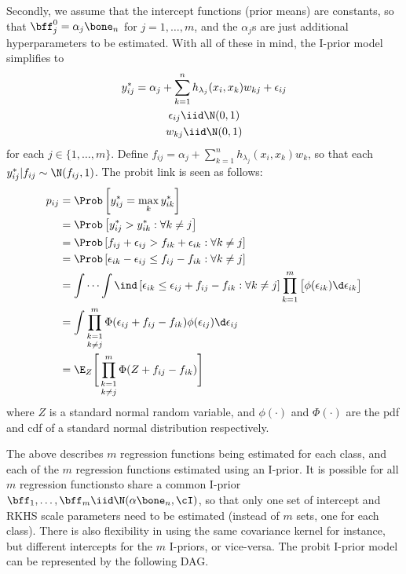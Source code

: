 Secondly, we assume that the intercept functions (prior means) are constants, so that $\bff^0_j = \alpha_j\bone_n$ for $j=1,\dots,m$, and the $\alpha_j$s are just additional hyperparameters to be estimated. With all of these in mind, the I-prior model simplifies to
\begin{gather*}
  y_{ij}^* = \alpha_j + \sum_{k=1}^n h_{\lambda_j}(x_i, x_{k})w_{kj} + \epsilon_{ij} \\
  \epsilon_{ij} \iid \N(0,1) \\
  w_{kj} \iid \N(0,1) 
\end{gather*}
for each $j \in \{1,\dots,m\}$. Define $f_{ij} = \alpha_j + \sum_{k=1}^n h_{\lambda_j}(x_i, x_{k})w_k$, so that each $y_{ij}^*|f_{ij} \sim \N(f_{ij}, 1)$. The probit link is seen as follows:
\begin{align}
  p_{ij} 
  &= \Prob\left[y_{ij}^* = \max_k y_{ik}^* \right] \nonumber \\
  &= \Prob\left[y_{ij}^* > y_{ik}^* : \forall k \neq j \right] \nonumber \\
  &= \Prob\left[ 
  f_{ij} + \epsilon_{ij} > f_{ik} + \epsilon_{ik} : \forall k \neq j
   \right] \nonumber \\
  &= \Prob\left[\epsilon_{ik} - \epsilon_{ij} \leq f_{ij} - f_{ik} : \forall k \neq j \right] \nonumber \\
  &= \idotsint \ind\left[\epsilon_{ik} \leq \epsilon_{ij} + f_{ij} - f_{ik} : \forall k \neq j \right]
  \prod_{k=1}^m \big[ \phi(\epsilon_{ik}) \d\epsilon_{ik} \big] \nonumber \\
  &= \int \mathop{\prod_{k=1}^m}_{k\neq j} \Phi(\epsilon_{ij} + f_{ij} - f_{ik})
    \phi(\epsilon_{ij}) \d\epsilon_{ij} \label{eqn:probit-link} \\
  &= \E_Z \Bigg[ \mathop{\prod_{k=1}^m}_{k\neq j} \Phi(Z + f_{ij} - f_{ik}) \Bigg] \nonumber
\end{align}
where $Z$ is a standard normal random variable, and $\phi(\cdot)$ and $\Phi(\cdot)$ are the pdf and cdf of a standard normal distribution respectively. 

The above describes $m$ regression functions being estimated for each class, and each of the $m$ regression functions estimated using an I-prior. It is possible for all $m$ regression functions\footnotemark to share a common I-prior $\bff_1, \dots, \bff_m \iid \N(\alpha\bone_n, \cI)$, so that only one set of intercept and RKHS scale parameters need to be estimated (instead of $m$ sets, one for each class). There is also flexibility in using the same covariance kernel for instance, but different intercepts for the $m$ I-priors, or vice-versa. The probit I-prior model can be represented by the following DAG.

